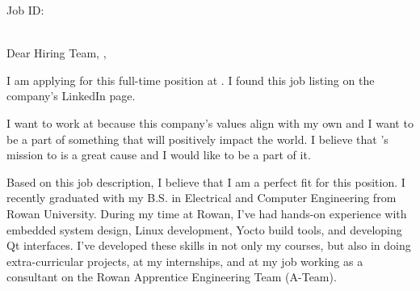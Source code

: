 \documentclass[11pt]{letter} %
\begin{document}
\begin{letter}
{
  \ifdefempty{\jobid}
    {}
    {Job ID: \jobid\\~\\}

  \companyaddress
}


\opening{
  Dear
\ifdefempty{\companyhiringmanager}
{Hiring Team,}
{\companyhiringmanager,}
}

I am applying for this full-time {\jobtitle} position at {\company}. I found
this job listing on the company's LinkedIn page.

I want to work at {\company} because this company's values
align with my own and I want to be a part of something that will
positively impact the world. I believe that {\company}'s mission to
{\companymission} is a great cause and I would like to be a part of it.

Based on this job description, I believe that I am a perfect fit for this
position.
I recently graduated with my B.S. in Electrical and Computer Engineering from
Rowan University. During my time at Rowan, I've had hands-on experience with
embedded system design, Linux development, Yocto build tools,
and developing Qt interfaces. I've developed these skills in not only my
courses, but also in doing extra-curricular projects, at my internships, and
at my job working as a consultant on the Rowan Apprentice Engineering
Team (A-Team).


\end{letter}
\end{document}
